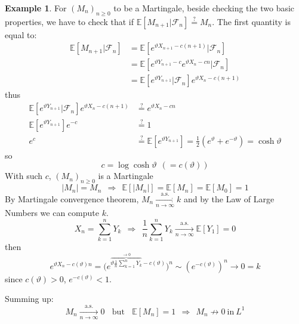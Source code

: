 \documentclass[10pt,a4paper]{article}
\theoremstyle{definition}
\newtheorem{exi}{Example}[section]
\newcommand{\questeq}{\stackrel{?}{=}}
\begin{document}
\begin{exi}
	For $( M_{n})_{n\geq 0}$ to be a Martingale, beside checking the two basic properties, we have to check that if $\mathbb{E}[ M_{n+1} |\mathcal{F}_{n}] \questeq M_{n}$. The first quantity is equal to:
	\begin{align*}
		\mathbb{E}[ M_{n+1} |\mathcal{F}_{n}] & =\mathbb{E}\left[ e^{\vartheta X_{n+1} -c( n+1)} |\mathcal{F}_{n}\right]                     \\
		                                      & =\mathbb{E}\left[ e^{\vartheta Y_{n+1} -c} e^{\vartheta X_{n} -cn} |\mathcal{F}_{n}\right]   \\
		                                      & =\mathbb{E}\left[ e^{\vartheta Y_{n+1}} |\mathcal{F}_{n}\right] e^{\vartheta X_{n} -c( n+1)} 
	\end{align*}
	thus
	\begin{align*}
		\mathbb{E}\left[ e^{\vartheta Y_{n+1}} |\mathcal{F}_{n}\right] e^{\vartheta X_{n} -c( n+1)} & \questeq e^{\vartheta X_{n} -cn}                                                                                                  \\
		\mathbb{E}\left[ e^{\vartheta Y_{n+1}}\right] e^{-c}                                        & \questeq 1                                                                                                                        \\
		e^{c}                                                                                       & \questeq \mathbb{E}\left[ e^{\vartheta Y_{n+1}}\right] =\frac{1}{2}\left( e^{\vartheta } +e^{-\vartheta }\right) =\cosh \vartheta 
	\end{align*}
	so
	\begin{equation*}
		c=\log\cosh \vartheta \ \ ( =c( \vartheta ))
	\end{equation*}
	With such $c$, $( M_{n})_{n\geq 0}$ is a Martingale
	\begin{equation*}
		| M_{n}| =M_{n} \ \ \Rightarrow \ \ \mathbb{E}[| M_{n}| ] =\mathbb{E}[ M_{n}] =\mathbb{E}[ M_{0}] =1
	\end{equation*}
	By Martingale convergence theorem, $M_{n}\xrightarrow[n\rightarrow \infty ]{\text{a.s.}} k$ and by the Law of Large Numbers we can compute $k$.
	\begin{equation*}
		X_{n} =\sum\limits _{k=1}^{n} Y_{k} \ \ \Rightarrow \ \ \frac{1}{n}\sum\limits _{k=1}^{n} Y_{k}\xrightarrow[n\rightarrow \infty ]{\text{a.s.}}\mathbb{E}[ Y_{1}] =0
	\end{equation*}
	then
	\begin{equation*}
		e^{\vartheta X_{n} -c( \vartheta ) n} =\Bigg( e^{\overbrace{\vartheta \frac{1}{n}\sum _{k=1}^{n} Y_{k}}^{\rightarrow 0} -c( \vartheta )}\Bigg)^{n} \sim \left( e^{-c( \vartheta )}\right)^{n}\rightarrow 0=k
	\end{equation*}
	since $c( \vartheta )  >0$, $e^{-c( \vartheta )} < 1$.

	Summing up:
	\begin{equation*}
		M_{n}\xrightarrow[n\rightarrow \infty ]{\text{a.s.}} 0\ \ \ \ \text{but} \ \ \ \ \mathbb{E}[ M_{n}] =1\ \ \Rightarrow \ \ M_{n} \nrightarrow 0\ \text{in} \ L^{1}
	\end{equation*}
\end{exi}
\end{document}
